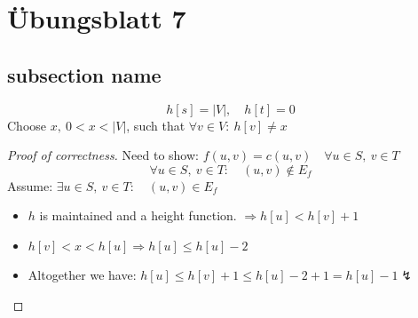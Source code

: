 \documentclass[12pt,oneside,a4paper,parskip=on,fleqn]{scrartcl}
\begin{document}
\section*{Übungsblatt 7} %
\label{sec:uebungsblatt_7}
\subsection{subsection name} %
\label{sub:subsection_name}

	\[
		h[s] = |V|,\quad h[t] = 0
	\]
	Choose $x,\ 0<x<|V|$, such that $\forall v\in V:\ h[v] \neq x$
	\begin{proof}[Proof of correctness]
		Need to show: $f(u,v) = c(u,v)\quad \forall u\in S,\ v\in T$
		\[
			\forall u\in S,\ v\in T:\quad (u,v) \not\in E_f
		\]
		Assume: $\exists u\in S,\ v\in T:\quad (u,v) \in E_f$
		\begin{itemize}
			\item $h$ is maintained and a height function. $\Rightarrow h[u] < h[v] +1$
			\item $h[v] < x < h[u] \Rightarrow h[u] \leq h[u] - 2$
			\item Altogether we have: $h[u] \leq h[v] + 1 \leq h[u] -2 + 1 = h[u] - 1 \lightning$
		\end{itemize}
	\end{proof}

\end{document}
